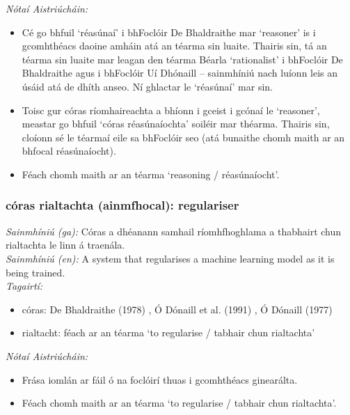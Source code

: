  \noindent \textit{Nótaí Aistriúcháin:}
\begin{itemize}
	\item Cé go bhfuil `réasúnaí' i bhFoclóir De Bhaldraithe mar `reasoner' is i gcomhthéacs daoine amháin atá an téarma sin luaite. Thairis sin, tá an téarma sin luaite mar leagan den téarma Béarla `rationalist' i bhFoclóir De Bhaldraithe agus i bhFoclóir Uí Dhónaill -- sainmhíniú nach luíonn leis an úsáid atá de dhíth anseo. Ní ghlactar le `réasúnaí' mar sin.
	\item Toisc gur córas ríomhaireachta a bhíonn i gceist i gcónaí le `reasoner', meastar go bhfuil `córas réasúnaíochta' soiléir mar théarma. Thairis sin, cloíonn sé le téarmaí eile sa bhFoclóir seo (atá bunaithe chomh maith ar an bhfocal réasúnaíocht).
	\item Féach chomh maith ar an téarma `reasoning / réasúnaíocht'.
\end{itemize}


\subsubsection*{córas rialtachta (ainmfhocal): regulariser}
 \noindent \textit{Sainmhíniú (ga):} Córas a dhéanann samhail ríomhfhoghlama a thabhairt chun rialtachta le linn á traenála.
\\
 \noindent \textit{Sainmhíniú (en):} A system that regularises a machine learning model as it is being trained.
\\
 \noindent \textit{Tagairtí:}
\begin{itemize}
	\item córas: De Bhaldraithe (1978) \cite{de-bhaldraithe}, Ó Dónaill et al. (1991) \cite{focloir-beag}, Ó Dónaill (1977) \cite{odonaill}
	\item rialtacht: féach ar an téarma `to regularise / tabhair chun rialtachta'
\end{itemize}

 \noindent \textit{Nótaí Aistriúcháin:}
\begin{itemize}
	\item Frása iomlán ar fáil ó na foclóirí thuas i gcomhthéacs ginearálta.
	\item Féach chomh maith ar an téarma `to regularise / tabhair chun rialtachta'.
\end{itemize}


